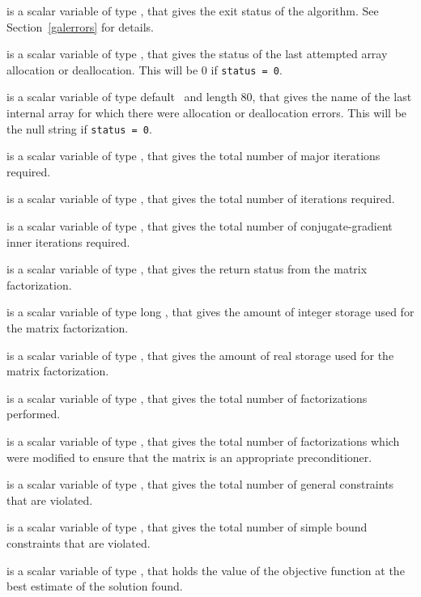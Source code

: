\begin{description}

 is a scalar variable of type \integer, that gives the
exit status of the algorithm. 
See Section~\ref{galerrors}
for details.

 is a scalar variable of type \integer, that gives
the status of the last attempted array allocation or deallocation.
This will be 0 if {\tt status = 0}.

 is a scalar variable of type default \character\
and length 80, that  gives the name of the last internal array 
for which there were allocation or deallocation errors.
This will be the null string if {\tt status = 0}. 

 is a scalar variable of type \integer, that gives the
total number of major iterations required.

 is a scalar variable of type \integer, that gives the
total number of iterations required.

 is a scalar variable of type \integer, that gives the
total number of conjugate-gradient inner iterations required.

 is a scalar variable of type \integer, that 
gives the return status from the matrix factorization.

 is a scalar variable of type long
\integer, that gives the amount of integer storage used for the matrix 
factorization.

 is a scalar variable of type \longinteger, 
that gives the amount of real storage used for the matrix factorization.

 is a scalar variable of type \integer, that gives the
total number of factorizations performed.

 is a scalar variable of type \integer, that gives the
total number of factorizations which were modified to 
ensure that the matrix is an appropriate preconditioner. 

 is a scalar variable of type \integer, that 
gives the total number of general constraints that are violated.

 is a scalar variable of type \integer, that 
gives the total number of simple bound constraints that are violated.

 is a scalar variable of type \realdp, that holds the
value of the objective function at the best estimate of the solution found.


\end{description}
